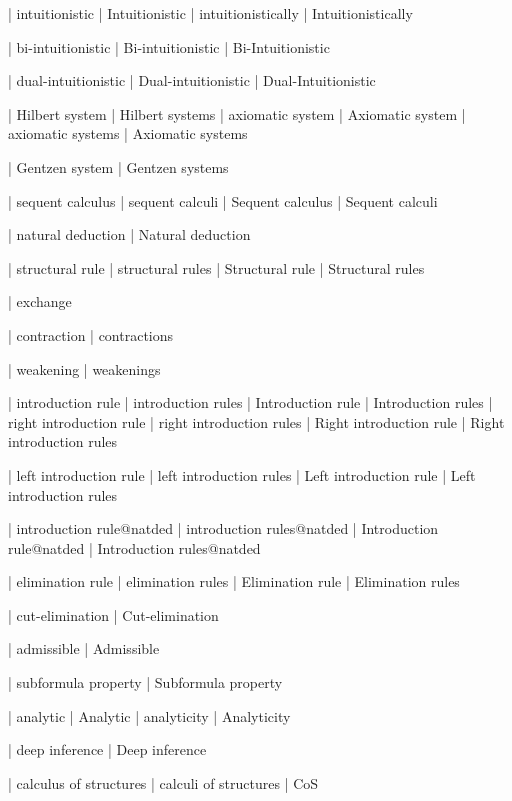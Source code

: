  | intuitionistic
 | Intuitionistic
 | intuitionistically
 | Intuitionistically

 | bi-intuitionistic
 | Bi-intuitionistic
 | Bi-Intuitionistic

 | dual-intuitionistic
 | Dual-intuitionistic
 | Dual-Intuitionistic

 | Hilbert system
 | Hilbert systems
 | axiomatic system
 | Axiomatic system
 | axiomatic systems
 | Axiomatic systems

 | Gentzen system
 | Gentzen systems

 | sequent calculus
 | sequent calculi
 | Sequent calculus
 | Sequent calculi

 | natural deduction
 | Natural deduction

 | structural rule
 | structural rules
 | Structural rule
 | Structural rules

 | exchange

 | contraction
 | contractions

 | weakening
 | weakenings

 | introduction rule
 | introduction rules
 | Introduction rule
 | Introduction rules
 | right introduction rule
 | right introduction rules
 | Right introduction rule
 | Right introduction rules

 | left introduction rule
 | left introduction rules
 | Left introduction rule
 | Left introduction rules

 | introduction rule@natded
 | introduction rules@natded
 | Introduction rule@natded
 | Introduction rules@natded

 | elimination rule
 | elimination rules
 | Elimination rule
 | Elimination rules

 | cut-elimination
 | Cut-elimination

 | admissible
 | Admissible

 | subformula property
 | Subformula property

 | analytic
 | Analytic
 | analyticity
 | Analyticity

 | deep inference
 | Deep inference

 | calculus of structures
 | calculi of structures
 | CoS
 
